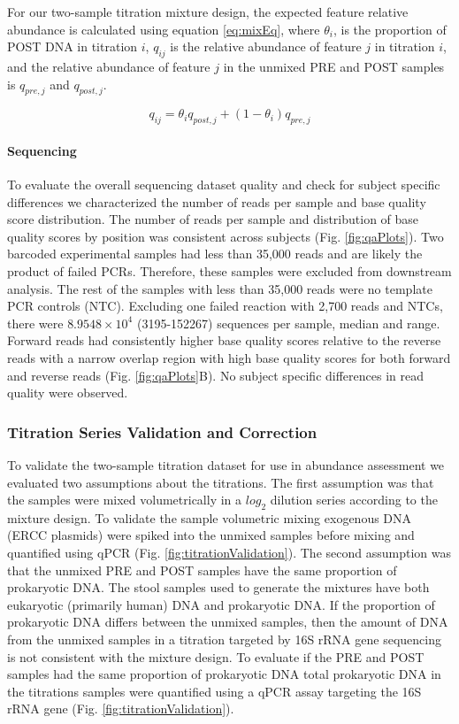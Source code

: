 \documentclass[linenumbers]{bmcart}
\begin{document}
For our two-sample titration mixture design, the expected feature
relative abundance is calculated using equation \eqref{eq:mixEq},
where \(\theta_i\), is the proportion of POST DNA in titration \(i\),
\(q_{ij}\) is the relative abundance of feature \(j\) in titration
\(i\), and the relative abundance of feature \(j\) in the unmixed PRE
and POST samples is \(q_{pre,j}\) and \(q_{post,j}\).

\begin{equation}
  q_{ij} = \theta_i q_{post,j} + (1 - \theta_i) q_{pre,j}
  \label{eq:mixEq}
\end{equation}

\paragraph{Sequencing}
To evaluate the overall sequencing dataset quality and check for subject
specific differences we characterized the number of reads per sample and
base quality score distribution. The number of reads per sample and
distribution of base quality scores by position was consistent across subjects (Fig. \ref{fig:qaPlots}). Two barcoded experimental samples had less than
35,000 reads and are likely the product of failed PCRs.
Therefore, these samples were excluded from downstream analysis.
The rest of the samples with less than 35,000 reads were no template PCR
controls (NTC). Excluding one failed reaction with 2,700 reads and NTCs, there
were \(8.9548\times 10^{4}\) (3195-152267) sequences per sample, median and
range. Forward reads had consistently higher base quality scores relative to
the reverse reads with a narrow overlap region with high base quality scores
for both forward and reverse reads (Fig. \ref{fig:qaPlots}B).
No subject specific differences in read quality were observed.

\subsubsection*{Titration Series Validation and Correction}

To validate the two-sample titration dataset for use in abundance
assessment we evaluated two assumptions about the titrations.
The first assumption was that the samples were mixed volumetrically in a
\(log_2\) dilution series according to the mixture design. To validate the
sample volumetric mixing exogenous DNA (ERCC plasmids) were spiked into the
unmixed samples before mixing and quantified
using qPCR (Fig. \ref{fig:titrationValidation}).
The second assumption was that the unmixed PRE and POST samples
have the same proportion of prokaryotic DNA. The stool samples used to
generate the mixtures have both eukaryotic (primarily human) DNA and
prokaryotic DNA. If the proportion of prokaryotic DNA differs between
the unmixed samples, then the amount of DNA from the unmixed samples in
a titration targeted by 16S rRNA gene sequencing is not consistent with
the mixture design. To evaluate if the PRE and POST samples had the same
proportion of prokaryotic DNA total prokaryotic DNA in the titrations
samples were quantified using a qPCR assay targeting the 16S rRNA gene (Fig. \ref{fig:titrationValidation}).
\end{document}
